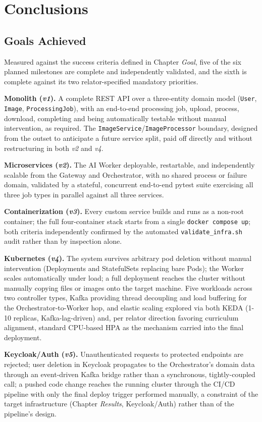 \documentclass[twoside]{supsistudent}
\begin{document}
\chapter{Conclusions}

\section{Goals Achieved}
Measured against the success criteria defined in Chapter \emph{Goal}, five of the six planned milestones are complete and independently validated, and the sixth is complete against its two relator-specified mandatory priorities.

\textbf{Monolith (\emph{v1}).} A complete REST API over a three-entity domain model (\texttt{User}, \texttt{Image}, \texttt{ProcessingJob}), with an end-to-end processing job, upload, process, download, completing and being automatically testable without manual intervention, as required. The \texttt{ImageService}/\texttt{ImageProcessor} boundary, designed from the outset to anticipate a future service split, paid off directly and without restructuring in both \emph{v2} and \emph{v4}.

\textbf{Microservices (\emph{v2}).} The AI Worker deployable, restartable, and independently scalable from the Gateway and Orchestrator, with no shared process or failure domain, validated by a stateful, concurrent end-to-end pytest suite exercising all three job types in parallel against all three services.

\textbf{Containerization (\emph{v3}).} Every custom service builds and runs as a non-root container; the full four-container stack starts from a single \texttt{docker compose up}; both criteria independently confirmed by the automated \texttt{validate\_infra.sh} audit rather than by inspection alone.

\textbf{Kubernetes (\emph{v4}).} The system survives arbitrary pod deletion without manual intervention (Deployments and StatefulSets replacing bare Pods); the Worker scales automatically under load; a full deployment reaches the cluster without manually copying files or images onto the target machine. Five workloads across two controller types, Kafka providing thread decoupling and load buffering for the Orchestrator-to-Worker hop, and elastic scaling explored via both KEDA (1-10 replicas, Kafka-lag-driven) and, per relator direction favoring curriculum alignment, standard CPU-based HPA as the mechanism carried into the final deployment.

\textbf{Keycloak/Auth (\emph{v5}).} Unauthenticated requests to protected endpoints are rejected; user deletion in Keycloak propagates to the Orchestrator's domain data through an event-driven Kafka bridge rather than a synchronous, tightly-coupled call; a pushed code change reaches the running cluster through the CI/CD pipeline with only the final deploy trigger performed manually, a constraint of the target infrastructure (Chapter \emph{Results}, Keycloak/Auth) rather than of the pipeline's design.
\end{document}
